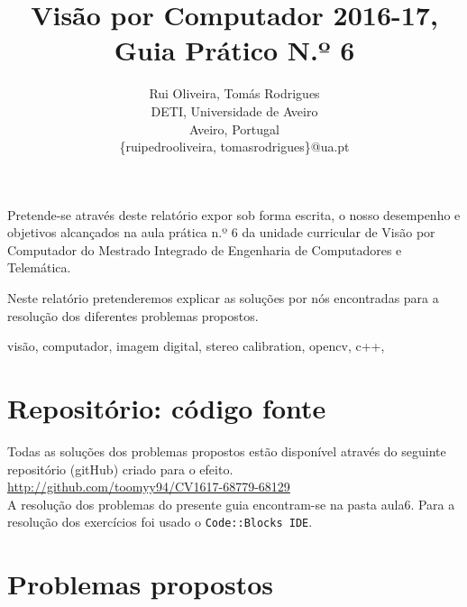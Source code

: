 \documentclass[portuguese, times, mirror]{revdetua}
\begin{document}

\title{Visão por Computador 2016-17, Guia Prático N.º 6}
\author{Rui Oliveira, Tomás Rodrigues\\ DETI, Universidade de Aveiro \\ Aveiro, Portugal \\ \{ruipedrooliveira, tomasrodrigues\}@ua.pt}
\maketitle

\begin{resumo}


Pretende-se através deste relatório expor sob forma escrita, o nosso desempenho e objetivos alcançados na aula prática n.º 6 da unidade curricular de Visão por Computador do Mestrado Integrado de Engenharia de Computadores e Telemática.

Neste relatório pretenderemos explicar as soluções por nós encontradas para a resolução dos diferentes problemas propostos.


\end{resumo} 

\begin{palavraschave} %
visão, computador, imagem digital, stereo calibration, opencv, c++, 
 \end{palavraschave} %




\section{Repositório: código fonte}


Todas as soluções dos problemas propostos estão disponível através do seguinte repositório (gitHub) criado para o efeito. \\

\href{http://github.com/toomyy94/CV1617-68779-68129}{http://github.com/toomyy94/CV1617-68779-68129}
\\


A resolução dos problemas do presente guia encontram-se na pasta aula6. Para a resolução dos exercícios foi usado o \texttt{Code::Blocks IDE}. 



\section{Problemas propostos}
\end{document}
